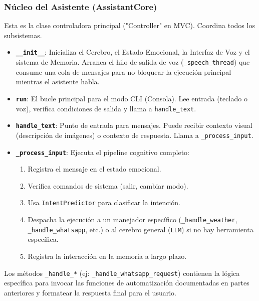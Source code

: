 \documentclass[letterpaper,12pt]{article}
\begin{document}
\subsubsection{Núcleo del Asistente (AssistantCore)}

Esta es la clase controladora principal ("Controller" en MVC). Coordina todos los subsistemas.
\begin{itemize}
    \item \textbf{\texttt{\_\_init\_\_}}: Inicializa el Cerebro, el Estado Emocional, la Interfaz de Voz y el sistema de Memoria. Arranca el hilo de salida de voz (\texttt{\_speech\_thread}) que consume una cola de mensajes para no bloquear la ejecución principal mientras el asistente habla.
    \item \textbf{\texttt{run}}: El bucle principal para el modo CLI (Consola). Lee entrada (teclado o voz), verifica condiciones de salida y llama a \texttt{handle\_text}.
    \item \textbf{\texttt{handle\_text}}: Punto de entrada para mensajes. Puede recibir contexto visual (descripción de imágenes) o contexto de respuesta. Llama a \texttt{\_process\_input}.
    \item \textbf{\texttt{\_process\_input}}: Ejecuta el pipeline cognitivo completo:
    \begin{enumerate}
        \item Registra el mensaje en el estado emocional.
        \item Verifica comandos de sistema (salir, cambiar modo).
        \item Usa \texttt{IntentPredictor} para clasificar la intención.
        \item Despacha la ejecución a un manejador específico (\texttt{\_handle\_weather}, \texttt{\_handle\_whatsapp}, etc.) o al cerebro general (\texttt{LLM}) si no hay herramienta específica.
        \item Registra la interacción en la memoria a largo plazo.
    \end{enumerate}
\end{itemize}

Los métodos \texttt{\_handle\_*} (ej: \texttt{\_handle\_whatsapp\_request}) contienen la lógica específica para invocar las funciones de automatización documentadas en partes anteriores y formatear la respuesta final para el usuario.
\end{document}
